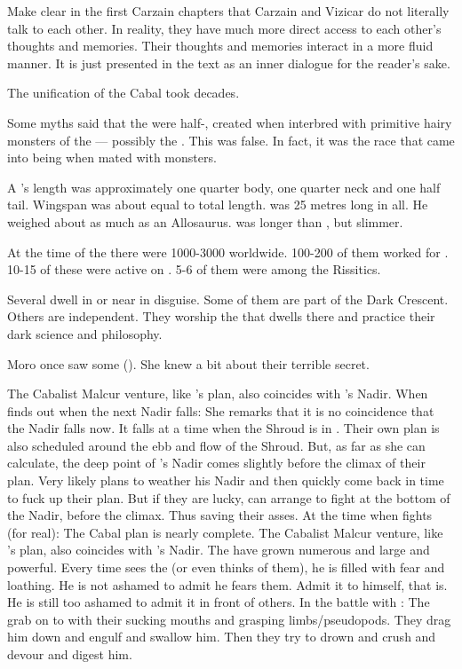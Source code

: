 Make clear in the first Carzain chapters that Carzain and Vizicar do not literally talk to each other. 
In reality, they have much more direct access to each other's thoughts and memories. 
Their thoughts and memories interact in a more fluid manner. 
It is just presented in the text as an inner dialogue for the reader's sake.


The unification of the Cabal took decades. 


Some myths said that the \nephilim were half-\humans, created when \humans interbred with primitive hairy monsters of the \wylde --- possibly the \gnomphilim. 
This was false. 
In fact, it was the \human race that came into being when \nephilim mated with monsters.


A \dragon's length was approximately one quarter body, one quarter neck and one half tail.
Wingspan was about equal to total length.
\Ishnaruchaefir was 25 metres long in all. He weighed about as much as an Allosaurus. 
\Secherdamon was longer than \Ishnaruchaefir, but slimmer. 


At the time of the \thirdbanewar there were 1000-3000 \quiljaaran worldwide. 
100-200 of them worked for \Secherdamon.
10-15 of these were active on \Azmith.
5-6 of them were among the Rissitics. 

Several \quiljaaran dwell in or near \Yormis in disguise. 
Some of them are part of the Dark Crescent.
Others are independent.
They worship the \xs that dwells there and practice their dark science and philosophy. 

Moro \Cornel once saw some \quiljaaran (\quo{\serpentmen}). 
She knew a bit about their terrible secret. 


The Cabalist Malcur venture, like \Secherdamon's plan, also coincides with \Ishnaruchaefir's Nadir. 
When \Urizeth finds out when the next Nadir falls:
  She remarks that it is no coincidence that the Nadir falls now.
  It falls at a time when the Shroud is in . 
  Their own plan is also scheduled around the ebb and flow of the Shroud.
  But, as far as she can calculate, the deep point of \Ishnaruchaefir's Nadir comes slightly before the climax of their plan. 
  Very likely \Ishnaruchaefir plans to weather his Nadir and then quickly come back in time to fuck up their plan.
  But if they are lucky, \Teshrial can arrange to fight \Ishnaruchaefir at the bottom of the Nadir, before the climax.
  Thus saving their asses.
At the time when \Teshrial fights \Ishnaruchaefir (for real):
  The Cabal plan is nearly complete. 
  The Cabalist Malcur venture, like \Secherdamon's plan, also coincides with \Ishnaruchaefir's Nadir. 
  The \noggyaleth have grown numerous and large and powerful.
Every time \Teshrial sees the \noggyaleth (or even thinks of them), he is filled with fear and loathing. 
He is not ashamed to admit he fears them. 
Admit it to himself, that is.
He is still too ashamed to admit it in front of others.
In the battle with \Ishnaruchaefir:
  The \noggyaleth grab on to \Ishnaruchaefir with their sucking mouths and grasping limbs/pseudopods.
  They drag him down and engulf and swallow him.
  Then they try to drown and crush and devour and digest him.

